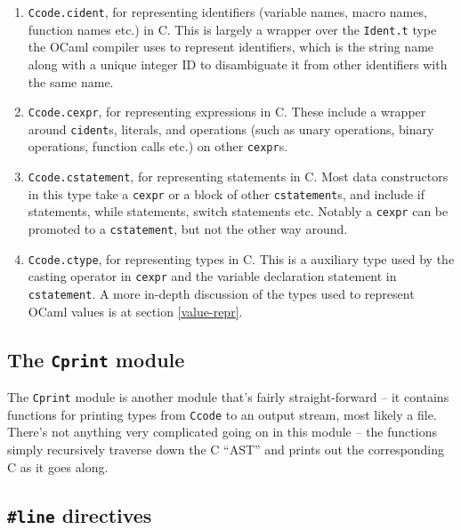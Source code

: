 \documentclass[12pt,a4paper,twoside,openright]{report}
\begin{document}
\begin{enumerate}
\item \texttt{Ccode.cident}, for representing identifiers (variable names, 
macro names, function names etc.) in C. This is largely a wrapper over the 
\texttt{Ident.t} type the OCaml compiler uses to represent identifiers, which 
is the string name along with a unique integer ID to disambiguate it from other 
identifiers with the same name.

\item \texttt{Ccode.cexpr}, for representing expressions in C. These include a 
wrapper around \texttt{cident}s, literals, and operations (such as unary 
operations, binary operations, function calls etc.) on other 
\texttt{cexpr}s.

\item \texttt{Ccode.cstatement}, for representing statements in C. Most data 
constructors in this type take a \texttt{cexpr} or a block of other 
\texttt{cstatement}s, and include if statements, while statements, switch 
statements etc. Notably a \texttt{cexpr} can be promoted to a 
\texttt{cstatement}, but not the other way around.

\item \texttt{Ccode.ctype}, for representing types in C. This is a auxiliary 
type used by the casting operator in \texttt{cexpr} and the variable 
declaration statement in \texttt{cstatement}. A more in-depth discussion of the 
types used to represent OCaml values is at section \ref{value-repr}.

\end{enumerate}

\subsection{The \texttt{Cprint} module}

The \texttt{Cprint} module is another module that's fairly straight-forward -- 
it contains functions for printing types from \texttt{Ccode} to an output 
stream, most likely a file. There's not anything very complicated going on in 
this module -- the functions simply recursively traverse down the C ``AST'' and 
prints out the corresponding C as it goes along.

\subsection{\texttt{\#}\texttt{line} directives} \label{line-directive}
\end{document}
